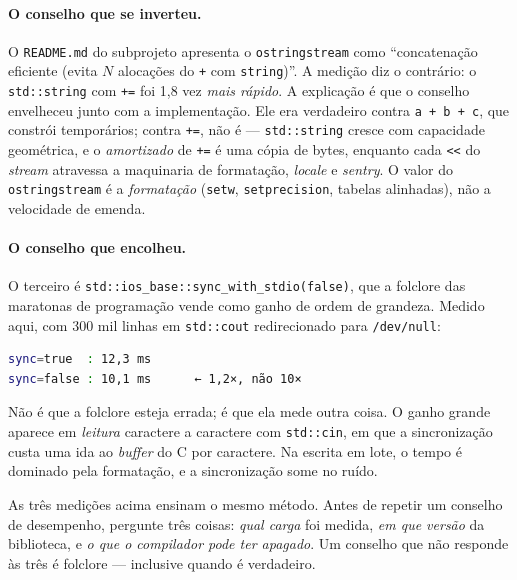 \paragraph{O conselho que se inverteu.} O \texttt{README.md} do subprojeto
apresenta o \texttt{ostringstream} como ``concatenação eficiente (evita $N$
alocações do \texttt{+} com \texttt{string})''. A medição diz o contrário: o
\texttt{std::string} com \texttt{+=} foi 1,8 vez \emph{mais rápido}. A
explicação é que o conselho envelheceu junto com a implementação. Ele era
verdadeiro contra \texttt{a + b + c}, que constrói temporários; contra
\texttt{+=}, não é --- \texttt{std::string} cresce com capacidade
geométrica, e o \emph{amortizado} de \texttt{+=} é uma cópia de bytes, enquanto
cada \texttt{<<} do \emph{stream} atravessa a maquinaria de formatação,
\emph{locale} e \emph{sentry}. O valor do \texttt{ostringstream} é a
\emph{formatação} (\texttt{setw}, \texttt{setprecision}, tabelas alinhadas),
não a velocidade de emenda.

\paragraph{O conselho que encolheu.} O terceiro é
\texttt{std::ios\_base::sync\_with\_stdio(false)}, que a folclore das maratonas
de programação vende como ganho de ordem de grandeza. Medido aqui, com 300 mil
linhas em \texttt{std::cout} redirecionado para \texttt{/dev/null}:

\begin{lstlisting}[style=bt, language=bash,
    caption={A mesma carga com e sem sincronização com o \texttt{stdio} do C.}]
sync=true  : 12,3 ms
sync=false : 10,1 ms      ← 1,2×, não 10×
\end{lstlisting}

Não é que a folclore esteja errada; é que ela mede outra coisa. O ganho grande
aparece em \emph{leitura} caractere a caractere com \texttt{std::cin}, em que a
sincronização custa uma ida ao \emph{buffer} do C por caractere. Na escrita em
lote, o tempo é dominado pela formatação, e a sincronização some no ruído.

\begin{regra}
As três medições acima ensinam o mesmo método. Antes de repetir um conselho de
desempenho, pergunte três coisas: \emph{qual carga} foi medida, \emph{em que
versão} da biblioteca, e \emph{o que o compilador pode ter apagado}. Um conselho
que não responde às três é folclore --- inclusive quando é verdadeiro.
\end{regra}

